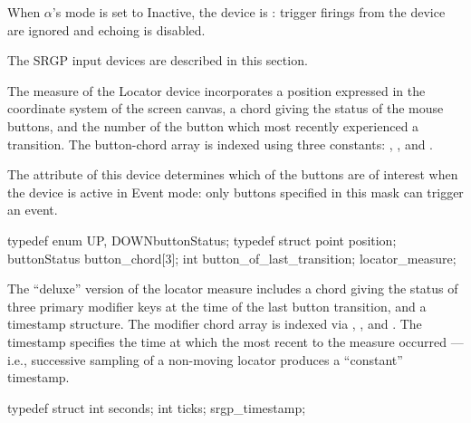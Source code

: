\indentpar
When $\alpha$'s mode is set to Inactive, the device is
: trigger firings from the device are ignored and
echoing is disabled.




The SRGP input devices are described in this section.

\bigskip

The measure of the Locator device incorporates a position expressed in the
coordinate system of the screen canvas, a chord giving the status of the mouse
buttons, and the number of the button which most recently experienced a
transition.  The button-chord array is indexed using three constants:
, , and
.  

\itemmm{}
The  attribute of this device determines which of the buttons
are of interest when the device is active in Event mode: only buttons specified
in this mask can trigger an event.

\begincode
               typedef enum \lb{}UP, DOWN\rb buttonStatus;
               typedef struct \lb
                  point position;
                  buttonStatus button_chord[3];
                  int button_of_last_transition;
               \rb locator_measure;
\endcode

\itemmm{} The ``deluxe'' version of the locator measure includes 
a chord giving the status of three primary modifier keys at the time of the
last button transition, and a timestamp structure.  The modifier chord array is
indexed via
, , and .
The timestamp specifies the time at which the most recent
 to the measure occurred --- i.e., successive sampling of a
non-moving locator produces a ``constant'' timestamp.

\begincode
              typedef struct \lb
                 int seconds;  
                 int ticks;    
              \rb srgp_timestamp;


